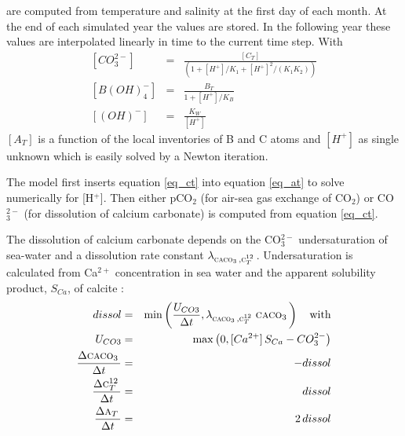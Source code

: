 \documentclass[11pt,a4paper,fleqn,twoside]{article}
\def\car{\text{\textsc{c$_T^{12}$}}\,}
\def\alk{\text{\textsc{a$_T$}}\,}
\def\cal{\text{\textsc{caco$_3$}}\,}
\begin{document}
are computed from temperature and salinity at the first day of  each
month. At the end of each simulated year the values are stored. In the
following year these values are interpolated linearly in time to the 
current time step. 
With
\begin{eqnarray}
\left[CO_3^{2-}\right]& = &\frac{\left[C_T\right]}{(1+\left[H^+\right]/K_1+\left[H^+\right]^2/(K_1K_2))} \\
\left[B(OH)_4^-\right]& = &\frac{B_T}{1+\left[H^+\right]/K_B} \\
\left[(OH)^-\right]& = &\frac{K_W}{\left[H^+\right]}
\end{eqnarray}
$[A_T]$ is a function of the local inventories of B and C atoms and $[H^+]$
as single unknown which is easily solved by a Newton iteration.

The model first inserts equation \ref{eq_ct} into equation \ref{eq_at} to solve
numerically for [H$^+$]. Then either pCO$_2$ (for air-sea gas exchange of
CO$_2$) or CO$_3^{2-}$ (for dissolution of calcium carbonate) is computed from
equation \ref{eq_ct}.

The dissolution of calcium carbonate depends on the CO$_3^{2-}$ undersaturation
of sea-water and a dissolution rate constant $\lambda_{\cal,\car}$.
Undersaturation is calculated from Ca$^{2+}$ concentration in sea water and the
apparent solubility product, $S_{Ca}$, of calcite :
\begin{eqnarray}
dissol & = & \min\left(\frac{U_{CO3}}{\Delta t},\lambda_{\cal,\car} \,\cal \right) \quad \mbox{with} \nonumber \\ 
U_{CO3} & = & \max\left(0, [Ca^{2+}]\,S_{Ca} - CO_3^{2-}\right)  \nonumber \\ 
\frac{\Delta  \cal}{\Delta  t}& = &  - dissol\\
\frac{\Delta  \car}{\Delta  t}& = &  dissol\\
\frac{\Delta  \alk}{\Delta  t}& = &  2 \, dissol
\end{eqnarray}
\end{document}
